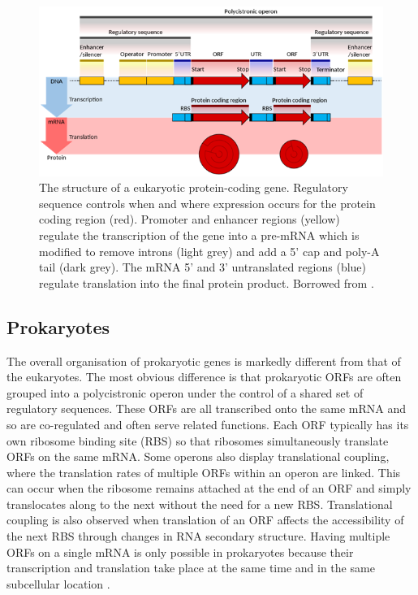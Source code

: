\begin{figure}[!ht]
    \centering
    \includegraphics[width=1\linewidth]{./figure/eukaryote_mrna.png}
    \caption{The structure of a eukaryotic protein-coding gene. Regulatory sequence controls when and where expression occurs 
    for the protein coding region (red). Promoter and enhancer regions (yellow) regulate the transcription of the gene into a 
    pre-mRNA which is modified to remove introns (light grey) and add a 5' cap and poly-A tail (dark grey). The mRNA 5' and 3' 
    untranslated regions (blue) regulate translation into the final protein product. Borrowed from  \cite{Schafee2017}.}
    \label{fig:eukaryote_mrna}
\end{figure}

\subsection{Prokaryotes}
The overall organisation of prokaryotic genes is markedly different from that of the eukaryotes. The most obvious difference 
is that prokaryotic ORFs are often grouped into a polycistronic operon under the control of a shared set of regulatory sequences. 
These ORFs are all transcribed onto the same mRNA and so are co-regulated and often serve related functions. Each ORF typically 
has its own ribosome binding site (RBS) so that ribosomes simultaneously translate ORFs on the same mRNA. Some operons 
also display translational coupling, where the translation rates of multiple ORFs within an operon are linked. This can 
occur when the ribosome remains attached at the end of an ORF and simply translocates along to the next without the need 
for a new RBS. Translational coupling is also observed when translation of an ORF affects the accessibility of the next 
RBS through changes in RNA secondary structure. Having multiple ORFs on a single mRNA is only possible in prokaryotes because 
their transcription and translation take place at the same time and in the same subcellular location \cite{Schafee2017}.  

